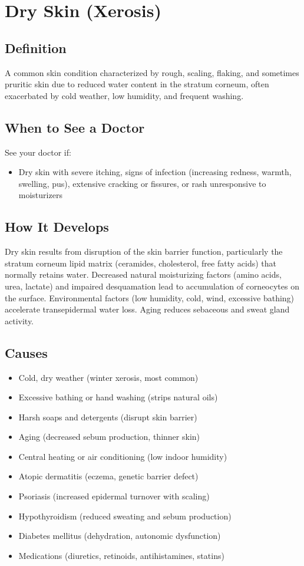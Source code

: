 \chapter{Dry Skin (Xerosis)}

\section*{Definition}
A common skin condition characterized by rough, scaling, flaking, and sometimes pruritic skin due to reduced water content in the stratum corneum, often exacerbated by cold weather, low humidity, and frequent washing.

\section*{When to See a Doctor}
See your doctor if:
\begin{itemize}
  \item Dry skin with severe itching, signs of infection (increasing redness, warmth, swelling, pus), extensive cracking or fissures, or rash unresponsive to moisturizers
\end{itemize}

\section*{How It Develops}
Dry skin results from disruption of the skin barrier function, particularly the stratum corneum lipid matrix (ceramides, cholesterol, free fatty acids) that normally retains water. Decreased natural moisturizing factors (amino acids, urea, lactate) and impaired desquamation lead to accumulation of corneocytes on the surface. Environmental factors (low humidity, cold, wind, excessive bathing) accelerate transepidermal water loss. Aging reduces sebaceous and sweat gland activity.

\section*{Causes}
\begin{itemize}
  \item Cold, dry weather (winter xerosis, most common)
  \item Excessive bathing or hand washing (strips natural oils)
  \item Harsh soaps and detergents (disrupt skin barrier)
  \item Aging (decreased sebum production, thinner skin)
  \item Central heating or air conditioning (low indoor humidity)
  \item Atopic dermatitis (eczema, genetic barrier defect)
  \item Psoriasis (increased epidermal turnover with scaling)
  \item Hypothyroidism (reduced sweating and sebum production)
  \item Diabetes mellitus (dehydration, autonomic dysfunction)
  \item Medications (diuretics, retinoids, antihistamines, statins)
\end{itemize}

